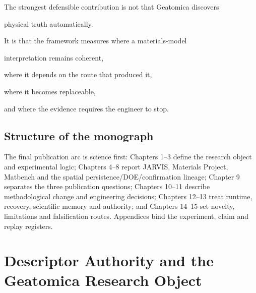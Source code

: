 \documentclass[11pt,a4paper,oneside]{report}
\begin{document}
\begin{claimboundary}



The strongest defensible contribution is not that Geatomica discovers

physical truth automatically.



It is that the framework measures where a materials-model

interpretation remains coherent,

where it depends on the route that produced it,

where it becomes replaceable,

and where the evidence requires the engineer to stop.



\end{claimboundary}



\section{Structure of the monograph}

The final publication arc is science first: Chapters 1--3 define the research object
and experimental logic; Chapters 4--8 report JARVIS, Materials Project, Matbench and
the spatial persistence/DOE/confirmation lineage; Chapter 9 separates the three
publication questions; Chapters 10--11 describe methodological change and engineering
decisions; Chapters 12--13 treat runtime, recovery, scientific memory and authority;
and Chapters 14--15 set novelty, limitations and falsification routes. Appendices bind
the experiment, claim and replay registers.

\chapter{Descriptor Authority and the Geatomica Research Object}

\begin{center}
\end{center}
\label{chap:descriptor-authority}
\end{document}
